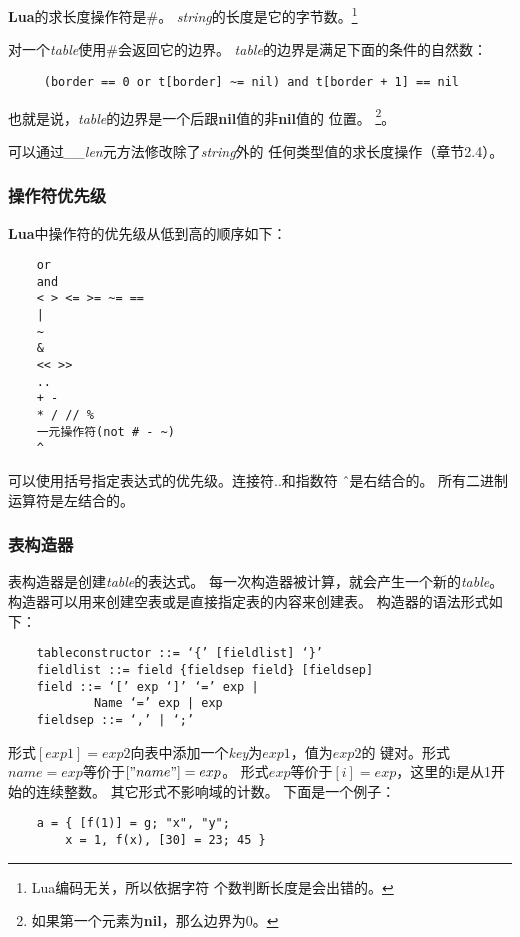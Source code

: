 \documentclass{ctexart}
\begin{document}
\textbf{Lua}的求长度操作符是\#。
\emph{string}的长度是它的字节数。\footnote{Lua编码无关，所以依据字符
个数判断长度是会出错的。}

对一个\emph{table}使用\#会返回它的边界。
\emph{table}的边界是满足下面的条件的自然数：

\lstset{language=C}
\begin{lstlisting}
	 (border == 0 or t[border] ~= nil) and t[border + 1] == nil
\end{lstlisting}

也就是说，\emph{table}的边界是一个后跟\textbf{nil}值的非\textbf{nil}值的
位置。
\footnote{如果第一个元素为\textbf{nil}，那么边界为0。}。

可以通过\emph{\_\_len}元方法修改除了\emph{string}外的
任何类型值的求长度操作（章节2.4）。

\subsubsection{操作符优先级}

\textbf{Lua}中操作符的优先级从低到高的顺序如下：

\lstset{language=C}
\begin{lstlisting}
	or
	and
	< > <= >= ~= ==
	|
	~
	&
	<< >>
	..
	+ -
	* / // %
	一元操作符(not # - ~)
	^
\end{lstlisting}

可以使用括号指定表达式的优先级。连接符..和指数符 \^ \ 是右结合的。
所有二进制运算符是左结合的。

\subsubsection{表构造器}

表构造器是创建\emph{table}的表达式。
每一次构造器被计算，就会产生一个新的\emph{table}。
构造器可以用来创建空表或是直接指定表的内容来创建表。
构造器的语法形式如下：

\lstset{language=C}
\begin{lstlisting}
	tableconstructor ::= ‘{’ [fieldlist] ‘}’
	fieldlist ::= field {fieldsep field} [fieldsep]
	field ::= ‘[’ exp ‘]’ ‘=’ exp | 
			Name ‘=’ exp | exp
	fieldsep ::= ‘,’ | ‘;’
\end{lstlisting}

形式$[exp1]=exp2$向表中添加一个\emph{key}为$exp1$，值为$exp2$的
键对。形式$name=exp$等价于$["name"]=exp$。
形式$exp$等价于$[i]=exp$，这里的i是从1开始的连续整数。
其它形式不影响域的计数。
下面是一个例子：

\lstset{language=C}
\begin{lstlisting}
	a = { [f(1)] = g; "x", "y";
		x = 1, f(x), [30] = 23; 45 }
\end{lstlisting}
\end{document}
